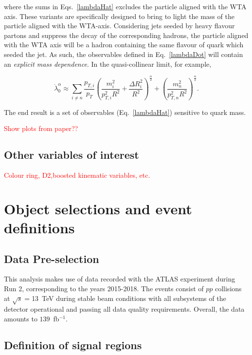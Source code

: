 \documentclass[10pt,a4paper]{book}
\begin{document}
where the sums in Eqs.~\ref{lambdaHat} excludes the particle aligned with the WTA axis. 
These variants are specifically designed to bring to light the mass of the particle aligned with the WTA-axis. Considering jets seeded by heavy flavour partons and suppress the decay of the corresponding hadrons, the particle aligned with the WTA axis will be a hadron containing the same flavour of quark which seeded the jet. As such, the observables defined in Eq.~\ref{lambdaDot} will contain an \emph{explicit mass dependence}. In the quasi-collinear limit, for example,

\begin{equation}
\dot{\lambda}^\alpha_0 \approx \sum_{i \neq n}\frac{p_{T,i}}{p_T}\left(\frac{m_i^2}{p_{T,i}^2R^2} + \frac{\Delta R_i^2}{R^2} \right)^{\frac{\alpha}{2}} + \left(\frac{m_n^2}{p_{T,n}^2R^2} \right)^{\frac{\alpha}{2}}.
\end{equation}

The end result is a set of observables (Eq.~\ref{lambdaHat}) sensitive to quark mass. 

\textcolor{red}{Show plots from paper??}

\subsection{Other variables of interest}
\textcolor{red}{Colour ring, D2,boosted kinematic variables, etc.}

\section{Object selections and event definitions}

\subsection{Data Pre-selection}

This analysis makes use of data recorded with the ATLAS experiment during Run 2, corresponding to the years 2015-2018. The events consist of $pp$ collisions at $\sqrt{s} = $13~TeV during stable beam conditions with all subsystems of the detector operational and passing all data quality requirements. Overall, the data amounts to $139$~fb$^{-1}$. 

\subsection{Definition of signal regions}
\end{document}
